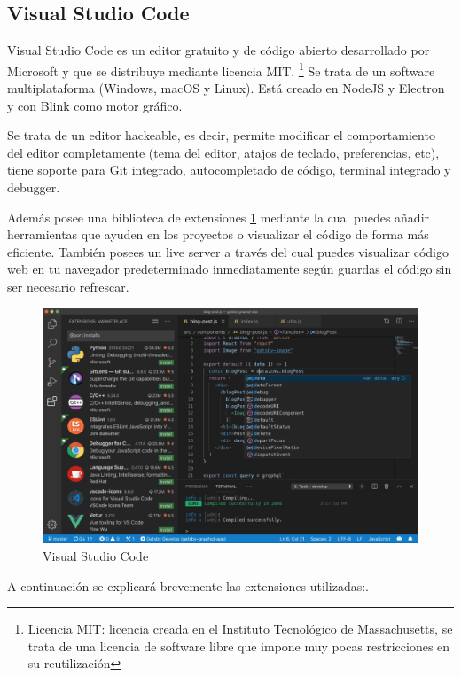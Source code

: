 \subsection{Visual Studio Code}

Visual Studio Code es un editor gratuito y de código abierto desarrollado por Microsoft y que se distribuye mediante licencia MIT. \footnote{Licencia MIT: licencia creada en el Instituto Tecnológico de Massachusetts, se trata de una licencia de software libre que impone muy pocas restricciones en su reutilización} Se trata de un software multiplataforma (Windows, macOS y Linux).
Está creado en NodeJS y Electron \cite{electron} y con Blink como motor gráfico.

Se trata de un editor hackeable, es decir, permite modificar el comportamiento del editor completamente (tema del editor, atajos de teclado, preferencias, etc), tiene soporte para Git integrado, autocompletado de código, terminal integrado y debugger.

Además posee una biblioteca de extensiones \ref{fig:vscode} mediante la cual puedes añadir herramientas que ayuden en los proyectos o visualizar el código de forma más eficiente. También posees un live server a través del cual puedes visualizar código web en tu navegador predeterminado inmediatamente según guardas el código sin ser necesario refrescar.

\begin{figure}[h]
    \centering
    \includegraphics[width=\textwidth]{include/figuras/VSCode.png}
    \caption{Visual Studio Code}
    \label{fig:vscode}
\end{figure}

A continuación se explicará brevemente las extensiones utilizadas:.

